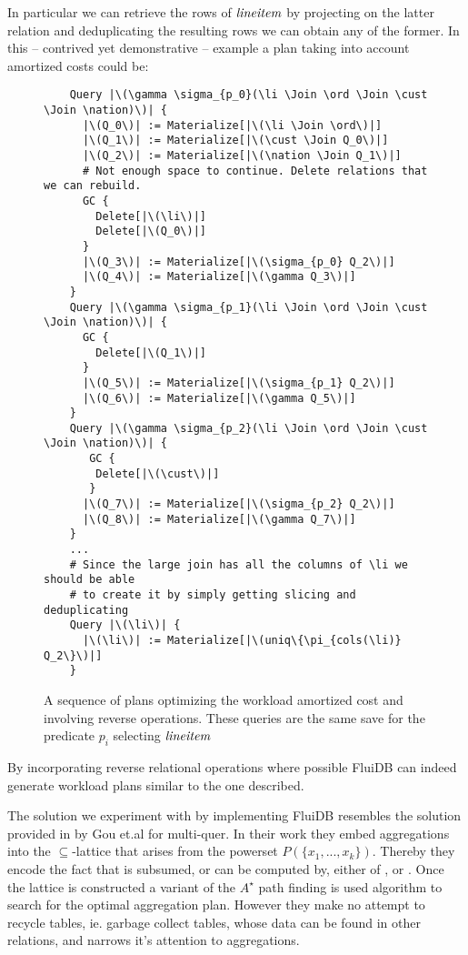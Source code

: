 In particular we can retrieve the rows of \(\mathit{lineitem}\) by projecting
on the latter relation and deduplicating the resulting rows we can
obtain any of the former. In this -- contrived yet demonstrative --
example a plan taking into account amortized costs could be:

\begin{figure}[H]
\begin{verbatim}
    Query |\(\gamma \sigma_{p_0}(\li \Join \ord \Join \cust \Join \nation)\)| {
      |\(Q_0\)| := Materialize[|\(\li \Join \ord\)|]
      |\(Q_1\)| := Materialize[|\(\cust \Join Q_0\)|]
      |\(Q_2\)| := Materialize[|\(\nation \Join Q_1\)|]
      # Not enough space to continue. Delete relations that we can rebuild.
      GC {
        Delete[|\(\li\)|]
        Delete[|\(Q_0\)|]
      }
      |\(Q_3\)| := Materialize[|\(\sigma_{p_0} Q_2\)|]
      |\(Q_4\)| := Materialize[|\(\gamma Q_3\)|]
    }
    Query |\(\gamma \sigma_{p_1}(\li \Join \ord \Join \cust \Join \nation)\)| {
      GC {
        Delete[|\(Q_1\)|]
      }
      |\(Q_5\)| := Materialize[|\(\sigma_{p_1} Q_2\)|]
      |\(Q_6\)| := Materialize[|\(\gamma Q_5\)|]
    }
    Query |\(\gamma \sigma_{p_2}(\li \Join \ord \Join \cust \Join \nation)\)| {
       GC {
        Delete[|\(\cust\)|]
       }
      |\(Q_7\)| := Materialize[|\(\sigma_{p_2} Q_2\)|]
      |\(Q_8\)| := Materialize[|\(\gamma Q_7\)|]
    }
    ...
    # Since the large join has all the columns of \li we should be able
    # to create it by simply getting slicing and deduplicating
    Query |\(\li\)| {
      |\(\li\)| := Materialize[|\(uniq\{\pi_{cols(\li)} Q_2\}\)|]
    }
\end{verbatim}
  \caption{\label{fig:amortized_plan}A sequence of plans optimizing
    the workload amortized cost and involving reverse
    operations. These queries are the same save for the predicate
    \(p_i\) selecting \(\mathit{lineitem}\)}
\end{figure}

By incorporating reverse relational operations where possible FluiDB
can indeed generate workload plans similar to the one described.

The solution we experiment with by implementing FluiDB resembles the
solution provided in \cite{gouSupSearchEfficient2006} by Gou et.al for
multi-quer. In their work they embed aggregations  into the \(\subseteq\)-lattice that arises from the powerset
\(P(\{x_1, ..., x_k\})\). Thereby they encode the fact that  is subsumed, or can be computed by, either of ,  or . Once the
lattice is constructed a variant of the \(A^{\star}\) path finding is
used algorithm to search for the optimal aggregation plan. However
they make no attempt to recycle tables, ie. garbage collect tables,
whose data can be found in other relations, and narrows it's attention
to aggregations.


